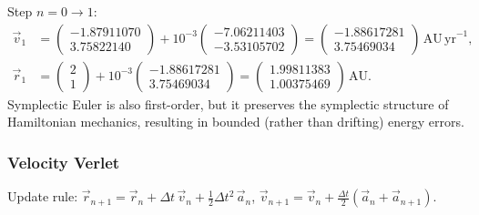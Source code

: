 Step $n = 0 \to 1$:
\begin{align*}
    \vec{v}_1 &= \begin{pmatrix}-1.87911070\\3.75822140\end{pmatrix}
    + 10^{-3}\begin{pmatrix}-7.06211403\\-3.53105702\end{pmatrix}
    = \begin{pmatrix}-1.88617281\\3.75469034\end{pmatrix}\,\mathrm{AU\,yr}^{-1},\\
    \vec{r}_1 &= \begin{pmatrix}2\\1\end{pmatrix}
    + 10^{-3}\begin{pmatrix}-1.88617281\\3.75469034\end{pmatrix}
    = \begin{pmatrix}1.99811383\\1.00375469\end{pmatrix}\,\mathrm{AU}.
\end{align*}
Symplectic Euler is also first-order, but it preserves the symplectic structure of Hamiltonian mechanics, resulting
in bounded (rather than drifting) energy errors.

\subsubsection*{Velocity Verlet}

Update rule: $\vec{r}_{n+1} = \vec{r}_n + \Delta t\,\vec{v}_n + \tfrac{1}{2}\Delta t^2\,\vec{a}_n$,\quad
$\vec{v}_{n+1} = \vec{v}_n + \tfrac{\Delta t}{2}(\vec{a}_n + \vec{a}_{n+1})$.

